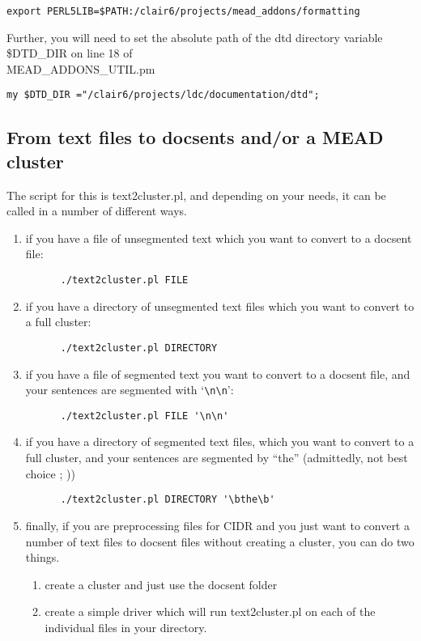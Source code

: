 \documentclass[10pt]{article}
\begin{document}
\begin{verbatim}
export PERL5LIB=$PATH:/clair6/projects/mead_addons/formatting
\end{verbatim}

Further, you 
will need to set the absolute path of the dtd directory variable \$DTD\_DIR on 
line 18 of\\
MEAD\_ADDONS\_UTIL.pm

\begin{verbatim}
my $DTD_DIR ="/clair6/projects/ldc/documentation/dtd";
\end{verbatim}

\subsection{From text files to docsents and/or a MEAD cluster}
The script for this is text2cluster.pl, and depending on your needs, it can be called in 
a number of different ways.

\begin{enumerate}

\item if you have a file of unsegmented text which you want to convert to a docsent file:
      \begin{verbatim}
      ./text2cluster.pl FILE
      \end{verbatim}

\item if you have a directory of unsegmented text files which you want to convert to a 
full cluster:
      \begin{verbatim}
      ./text2cluster.pl DIRECTORY
      \end{verbatim}

\item if you have a file of segmented text you want to convert to a docsent file, and 
your sentences are segmented with `\verb|\n\n|':
      \begin{verbatim}
      ./text2cluster.pl FILE '\n\n'
      \end{verbatim}

\item if you have a directory of segmented text files, which you want to convert to a
full cluster, and your sentences are segmented by ``the'' (admittedly, not best choice 
; ))
      \begin{verbatim}
      ./text2cluster.pl DIRECTORY '\bthe\b'
      \end{verbatim}

\item finally, if you are preprocessing files for CIDR and you just want to convert a 
number of text files to docsent files without creating a cluster, you can do two things.
      \begin{enumerate}
        \item create a cluster and just use the docsent folder
        \item create a simple driver which will run text2cluster.pl on each of the
                individual files in your directory.
      \end{enumerate}
\end{enumerate}
\end{document}
